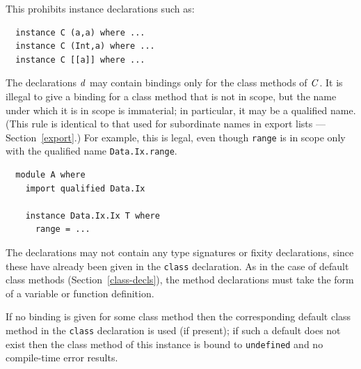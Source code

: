 This prohibits instance declarations
such as:
\bprog
{\small\begin{verbatim}
  instance C (a,a) where ...
  instance C (Int,a) where ...
  instance C [[a]] where ...
\end{verbatim}}
\eprog
The declarations \mbox{$\it d$} may contain bindings only for the class
methods of \mbox{$\it C$}.  It is illegal to give a 
binding for a class method that is not in scope, but the name under
which it is in scope is immaterial; in particular, it may be a qualified
name.  (This rule is identical to that used for subordinate names in
export lists --- Section~\ref{export}.)
For example, this is legal, even though \mbox{\tt range} is in scope only
with the qualified name \mbox{\tt Data.Ix.range}.
\bprog
{\small\begin{verbatim}
  module A where
    import qualified Data.Ix

    instance Data.Ix.Ix T where
      range = ...
\end{verbatim}}
\eprog
The declarations may not contain any type
signatures or fixity declarations,
since these have already been given in the \mbox{\tt class}
declaration.  As in the case of default class methods
%
(Section~\ref{class-decls}), the method declarations must take the form of
a variable or function definition.

% 
%

If no binding is given for some class method then the
corresponding default class method
in the \mbox{\tt class} declaration is used (if
present); if such a default does
not exist then the class method of this instance
is bound to \mbox{\tt undefined} 
and no compile-time error results.


